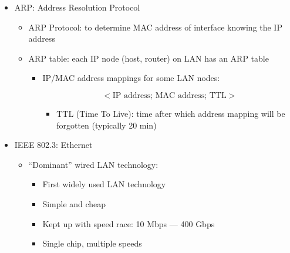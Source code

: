 \begin{itemize}
  \item ARP: Address Resolution Protocol

    \begin{itemize}

      \item ARP Protocol: to determine MAC address of interface knowing the IP address

      \item ARP table: each IP node (host, router) on LAN has an ARP table

        \begin{itemize}

          \item IP/MAC address mappings for some LAN nodes:

            $$<\text{IP address; MAC address; TTL}>$$

            \begin{itemize}

              \item TTL (Time To Live): time after which address mapping will be forgotten (typically 20 min)

            \end{itemize}

        \end{itemize}

    \end{itemize}

  \item IEEE 802.3: Ethernet

    \begin{itemize}

      \item ``Dominant'' wired LAN technology:

        \begin{itemize}

          \item First widely used LAN technology

          \item Simple and cheap

          \item Kept up with speed race: 10 Mbps — 400 Gbps

          \item Single chip, multiple speeds

        \end{itemize}

    \end{itemize}


\end{itemize}
